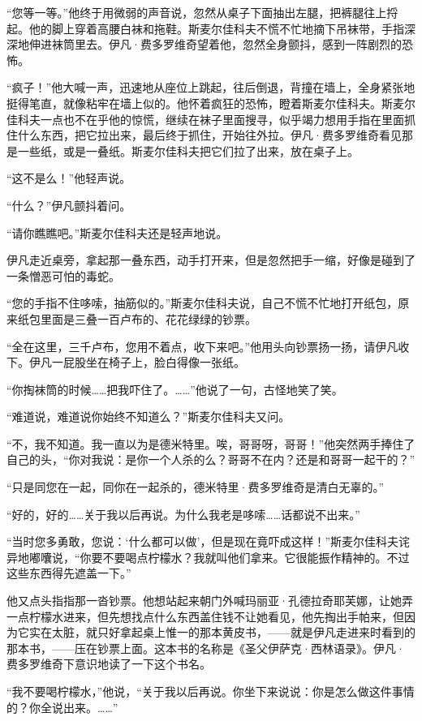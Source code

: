 \par “您等一等。”他终于用微弱的声音说，忽然从桌子下面抽出左腿，把裤腿往上捋起。他的脚上穿着高腰白袜和拖鞋。斯麦尔佳科夫不慌不忙地摘下吊袜带，手指深深地伸进袜筒里去。伊凡·费多罗维奇望着他，忽然全身颤抖，感到一阵剧烈的恐怖。
\par “疯子！”他大喊一声，迅速地从座位上跳起，往后倒退，背撞在墙上，全身紧张地挺得笔直，就像粘牢在墙上似的。他怀着疯狂的恐怖，瞪着斯麦尔佳科夫。斯麦尔佳科夫一点也不在乎他的惊慌，继续在袜子里面搜寻，似乎竭力想用手指在里面抓住什么东西，把它拉出来，最后终于抓住，开始往外拉。伊凡·费多罗维奇看见那是一些纸，或是一叠纸。斯麦尔佳科夫把它们拉了出来，放在桌子上。
\par “这不是么！”他轻声说。
\par “什么？”伊凡颤抖着问。
\par “请你瞧瞧吧。”斯麦尔佳科夫还是轻声地说。
\par 伊凡走近桌旁，拿起那一叠东西，动手打开来，但是忽然把手一缩，好像是碰到了一条憎恶可怕的毒蛇。
\par “您的手指不住哆嗦，抽筋似的。”斯麦尔佳科夫说，自己不慌不忙地打开纸包，原来纸包里面是三叠一百卢布的、花花绿绿的钞票。
\par “全在这里，三千卢布，您用不着点，收下来吧。”他用头向钞票扬一扬，请伊凡收下。伊凡一屁股坐在椅子上，脸白得像一张纸。
\par “你掏袜筒的时候……把我吓住了。……”他说了一句，古怪地笑了笑。
\par “难道说，难道说你始终不知道么？”斯麦尔佳科夫又问。
\par “不，我不知道。我一直以为是德米特里。唉，哥哥呀，哥哥！”他突然两手捧住了自己的头，“你对我说：是你一个人杀的么？哥哥不在内？还是和哥哥一起干的？”
\par “只是同您在一起，同你在一起杀的，德米特里·费多罗维奇是清白无辜的。”
\par “好的，好的……关于我以后再说。为什么我老是哆嗦……话都说不出来。”
\par “当时您多勇敢，您说：‘什么都可以做’，但是现在竟吓成这样！”斯麦尔佳科夫诧异地嘟囔说，“你要不要喝点柠檬水？我就叫他们拿来。它很能振作精神的。不过这些东西得先遮盖一下。”
\par 他又点头指指那一沓钞票。他想站起来朝门外喊玛丽亚·孔德拉奇耶芙娜，让她弄一点柠檬水进来，但先想找点什么东西盖住钱不让她看见，他先掏出手帕来，但因为它实在太脏，就只好拿起桌上惟一的那本黄皮书，——就是伊凡走进来时看到的那本书，——压在钞票上面。这本书的名称是《圣父伊萨克·西林语录》。伊凡·费多罗维奇下意识地读了一下这个书名。
\par “我不要喝柠檬水，”他说，“关于我以后再说。你坐下来说说：你是怎么做这件事情的？你全说出来。……”
